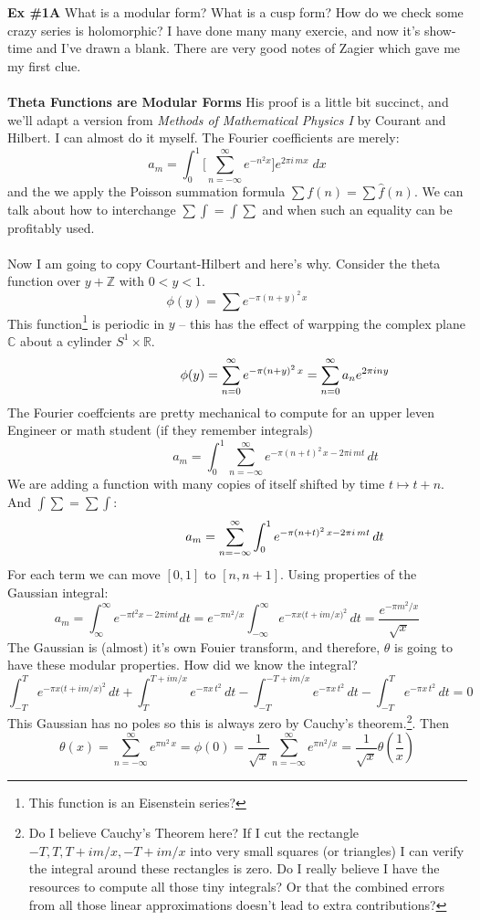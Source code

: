 \documentclass[12pt]{article}
\begin{document}
\noindent \textbf{Ex \#1A} What is a modular form?  What is a cusp form?  How do we check some crazy series is holomorphic?  I have done many many exercie, and now it's show-time and I've drawn a blank.  There are very good notes of Zagier which gave me my first clue. \\ \\
\textbf{Theta Functions are Modular Forms} His proof is a little bit succinct, and we'll adapt a version from \textit{Methods of Mathematical Physics I} by Courant and Hilbert.  I can almost do it myself.  The Fourier coefficients are merely:
$$ a_m = \int_0^1 \bigg[ \sum_{n = - \infty}^\infty e^{ - n^2 x} \bigg] e^{2\pi i \, m x} \; dx $$
and the we apply the Poisson summation formula $\sum f(n) = \sum \hat{f}(n)$.  We can talk about how to interchange $\sum \int = \int \sum$ and when such an equality can be profitably used.  \\ \\
Now I am going to copy Courtant-Hilbert and here's why.  Consider the theta function over $y + \mathbb{Z}$ with $0 < y < 1$.
$$\phi(y) = \sum e^{- \pi(n + y)^2 \, x}$$
This function\footnote{This function is an Eisenstein series?} is periodic in $y$ -- this has the effect of warpping the complex plane $\mathbb{C}$ about a cylinder $S^1 \times \mathbb{R}$.
$$ \hspace{1.04in}\phi(y) = \sum_{n =0}^\infty e^{- \pi(n + y)^2 \, x}
= \sum_{n =0}^\infty a_n e^{2\pi i n y}$$
The Fourier coeffcients are pretty mechanical to compute for an upper leven Engineer or math student (if they remember integrals)
$$ \hspace{1in} a_m = \int_0^1 \sum_{n = - \infty}^\infty e^{- \pi (n+t)^2 \, x - 2\pi i \, mt} \, dt $$
We are adding a function with many copies of itself shifted by  time $t \mapsto t + n$.  And $\int \sum = \sum \int$:
$$ \hspace{1.04in} a_m = \sum_{n = - \infty}^\infty \int_0^1 e^{- \pi (n+t)^2 \, x - 2\pi i \, mt} \, dt $$
For each term we can move $[0,1]$ to $[n, n+1]$.  Using properties of the Gaussian integral:
$$ a_m = \int_{\infty}^\infty e^{-\pi t^2 x - 2\pi i mt} dt = e^{-\pi n^2 / x}\int_{-\infty}^\infty e^{-\pi x \big(t + i m / x \big)^2} \, dt = \frac{e^{-\pi m^2 / x}}{\sqrt{x}}$$
The Gaussian is (almost) it's own Fouier transform, and therefore, $\theta$ is going to have these modular properties.  How did we know the integral?
$$ 
\int_{-T}^T e^{-\pi x \big(t + i m / x \big)^2} \, dt
+ \int_{T}^{T+im/x} e^{-\pi x \,t ^2} \, dt
- \int_{-T}^{-T+im/x} e^{-\pi x \,t ^2} \, dt
- \int_{-T}^T e^{-\pi x \,t^2} \, dt
= 0 $$
This Gaussian has no poles so this is always zero by Cauchy's theorem.\footnote{Do I believe Cauchy's Theorem here?  If I cut the rectangle $-T, T, T + im/x, -T + im/x $ into very small squares (or triangles) I can verify the integral around these rectangles is zero.  Do I really believe I have the resources to compute all those tiny integrals? Or that the combined errors from all those linear approximations doesn't lead to extra contributions?}.  Then
$$ \theta(x) = \sum_{n = - \infty}^\infty e^{\pi n^2 \, x}= \phi(0) = \frac{1}{\sqrt{x}}
\sum_{n = - \infty}^\infty e^{\pi n^2 / x}
= \frac{1}{\sqrt{x}} \theta(\frac{1}{x})$$
\end{document}
